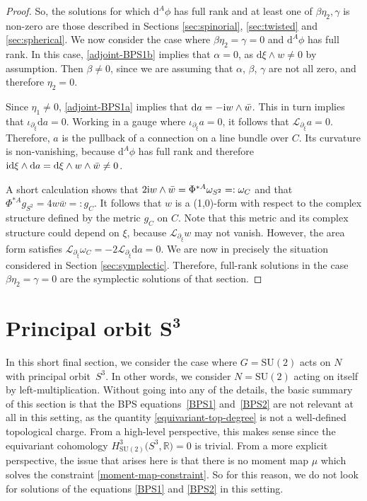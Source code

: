 \documentclass[10pt,a4paper]{amsart}
\newcommand{\LL}{{\mathcal{L}}}
\newcommand{\SU}{{\mathrm{SU}}}
\newcommand{\R}{{\mathbb{R}}}
\newcommand{\1}{{\mathbb{1}}}
\def \d{\mathrm{d}}
\numberwithin{equation}{section}
\begin{document}
\begin{proof}
So, the solutions for which $\d^A\phi$ has full rank and at least one of $\beta\eta_2,\gamma$ is non-zero are those described in Sections \ref{sec:spinorial}, \ref{sec:twisted} and \ref{sec:spherical}. We now consider the case where $\beta\eta_2=\gamma=0$ and $\d^A\phi$ has full rank. In this case, \eqref{adjoint-BPS1b} implies that $\alpha=0$, as $\d\xi\wedge w\neq0$ by assumption. Then $\beta\neq0$, since we are assuming that $\alpha$, $\beta$, $\gamma$ are not all zero, and therefore $\eta_2=0$.

Since $\eta_1\neq0$, \eqref{adjoint-BPS1a} implies that $\d a = -{\rm i}w\wedge\bar{w}$. This in turn implies that $\iota_{\partial_\xi}\d a = 0$. Working in a gauge where $\iota_{\partial_\xi}a=0$, it follows that $\LL_{\partial_\xi}a=0$. Therefore, $a$ is the pullback of a connection on a line bundle over $C$. Its curvature is non-vanishing, because $\d^A\phi$ has full rank and therefore ${\rm i}\d\xi\wedge\d a=\d\xi\wedge w\wedge\bar{w}\neq 0$.

A short calculation shows that $2{\rm i}w\wedge\bar{w}=\Phi^{\ast A}\omega_{S^2}=:\omega_C$ and that $\Phi^{\ast A}g_{S^2}=4w\bar{w}=:g_C$. It follows that $w$ is a (1,0)-form with respect to the complex structure defined by the metric $g_C$ on $C$. Note that this metric and its complex structure could depend on $\xi$, because $\LL_{\partial_\xi}w$ may not vanish. However, the area form satisfies $\LL_{\partial_\xi}\omega_C = -2\LL_{\partial_\xi}\d a = 0$. We are now in precisely the situation considered in Section \ref{sec:symplectic}. Therefore, full-rank solutions in the case $\beta\eta_2=\gamma=0$ are the symplectic solutions of that section.
\end{proof}

\section[Principal orbit S\^{}3]{Principal orbit $\boldsymbol{S^3}$}\label{sec:princ-orbit-S3}

In this short final section, we consider the case where $G=\SU(2)$ acts on $N$ with principal orbit~$S^3$. In other words, we consider $N=\SU(2)$ acting on itself by left-multiplication. Without going into any of the details, the basic summary of this section is that the BPS equations~\eqref{BPS1} and~\eqref{BPS2} are not relevant at all in this setting, as the quantity \eqref{equivariant-top-degree} is not a well-defined topological charge. From a high-level perspective, this makes sense since the equivariant cohomology $H^3_{\SU(2)}\big(S^3,\R\big)=0$ is trivial. From a more explicit perspective, the issue that arises here is that there is no moment map $\mu$ which solves the constraint \eqref{moment-map-constraint}. So for this reason, we do not look for solutions of the equations \eqref{BPS1} and \eqref{BPS2} in this setting.
\end{document}
